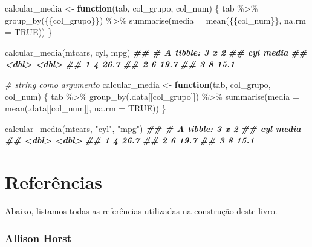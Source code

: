 \documentclass[
]{book}
\newenvironment{Shaded}{\begin{snugshade}}{\end{snugshade}}
\newcommand{\AttributeTok}[1]{\textcolor[rgb]{0.77,0.63,0.00}{#1}}
\newcommand{\CommentTok}[1]{\textcolor[rgb]{0.56,0.35,0.01}{\textit{#1}}}
\newcommand{\ConstantTok}[1]{\textcolor[rgb]{0.00,0.00,0.00}{#1}}
\newcommand{\ControlFlowTok}[1]{\textcolor[rgb]{0.13,0.29,0.53}{\textbf{#1}}}
\newcommand{\DocumentationTok}[1]{\textcolor[rgb]{0.56,0.35,0.01}{\textbf{\textit{#1}}}}
\newcommand{\FunctionTok}[1]{\textcolor[rgb]{0.00,0.00,0.00}{#1}}
\newcommand{\NormalTok}[1]{#1}
\newcommand{\OtherTok}[1]{\textcolor[rgb]{0.56,0.35,0.01}{#1}}
\newcommand{\SpecialCharTok}[1]{\textcolor[rgb]{0.00,0.00,0.00}{#1}}
\newcommand{\StringTok}[1]{\textcolor[rgb]{0.31,0.60,0.02}{#1}}
\begin{document}
\begin{Shaded}
\begin{Highlighting}[]
\NormalTok{calcular\_media }\OtherTok{\textless{}{-}} \ControlFlowTok{function}\NormalTok{(tab, col\_grupo, col\_num) \{}
\NormalTok{  tab }\SpecialCharTok{\%\textgreater{}\%} 
    \FunctionTok{group\_by}\NormalTok{(\{\{col\_grupo\}\}) }\SpecialCharTok{\%\textgreater{}\%} 
    \FunctionTok{summarise}\NormalTok{(}\AttributeTok{media =} \FunctionTok{mean}\NormalTok{(\{\{col\_num\}\}, }\AttributeTok{na.rm =} \ConstantTok{TRUE}\NormalTok{))}
\NormalTok{\}}

\FunctionTok{calcular\_media}\NormalTok{(mtcars, cyl, mpg)}
\DocumentationTok{\#\# \# A tibble: 3 x 2}
\DocumentationTok{\#\#     cyl media}
\DocumentationTok{\#\#   \textless{}dbl\textgreater{} \textless{}dbl\textgreater{}}
\DocumentationTok{\#\# 1     4  26.7}
\DocumentationTok{\#\# 2     6  19.7}
\DocumentationTok{\#\# 3     8  15.1}


\CommentTok{\# string como argumento}
\NormalTok{calcular\_media }\OtherTok{\textless{}{-}} \ControlFlowTok{function}\NormalTok{(tab, col\_grupo, col\_num) \{}
\NormalTok{  tab }\SpecialCharTok{\%\textgreater{}\%} 
    \FunctionTok{group\_by}\NormalTok{(.data[[col\_grupo]]) }\SpecialCharTok{\%\textgreater{}\%} 
    \FunctionTok{summarise}\NormalTok{(}\AttributeTok{media =} \FunctionTok{mean}\NormalTok{(.data[[col\_num]], }\AttributeTok{na.rm =} \ConstantTok{TRUE}\NormalTok{))}
\NormalTok{\}}

\FunctionTok{calcular\_media}\NormalTok{(mtcars, }\StringTok{"cyl"}\NormalTok{, }\StringTok{"mpg"}\NormalTok{)}
\DocumentationTok{\#\# \# A tibble: 3 x 2}
\DocumentationTok{\#\#     cyl media}
\DocumentationTok{\#\#   \textless{}dbl\textgreater{} \textless{}dbl\textgreater{}}
\DocumentationTok{\#\# 1     4  26.7}
\DocumentationTok{\#\# 2     6  19.7}
\DocumentationTok{\#\# 3     8  15.1}
\end{Highlighting}
\end{Shaded}

\hypertarget{referuxeancias}{%
\chapter*{Referências}\label{referuxeancias}}

Abaixo, listamos todas as referências utilizadas na construção deste livro.

\hypertarget{allison-horst}{%
\subsection*{Allison Horst}\label{allison-horst}}
\end{document}
